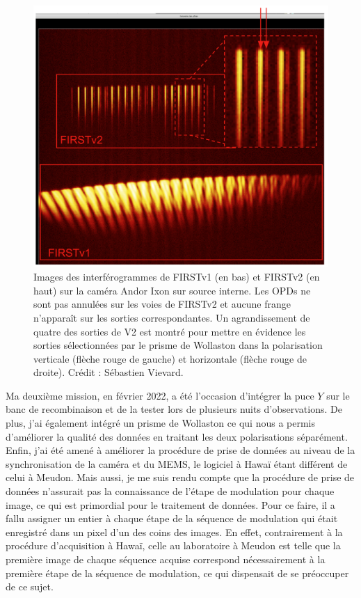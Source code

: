 \begin{figure}[ht!]
    \centering
    \includegraphics[width=\figwidth]{Figure_Chap5/image_2023_02_21T23_27_17_685Z.png}
    \caption[Images des interférogrammes de FIRSTv1 et FIRSTv2 sur la caméra Andor Ixon sur source interne.]{Images des interférogrammes de FIRSTv1 (en bas) et FIRSTv2 (en haut) sur la caméra Andor Ixon sur source interne. Les OPDs ne sont pas annulées sur les voies de FIRSTv2 et aucune frange n'apparaît sur les sorties correspondantes. Un agrandissement de quatre des sorties de V2 est montré pour mettre en évidence les sorties sélectionnées par le prisme de Wollaston dans la polarisation verticale (flèche rouge de gauche) et horizontale (flèche rouge de droite). Crédit : Sébastien Vievard.}
    \label{fig:V1V2Image}
\end{figure}

Ma deuxième mission, en février 2022, a été l'occasion d'intégrer la puce $Y$ sur le banc de recombinaison et de la tester lors de plusieurs nuits d'observations. De plus, j'ai également intégré un prisme de Wollaston ce qui nous a permis d'améliorer la qualité des données en traitant les deux polarisations séparément. Enfin, j'ai été amené à améliorer la procédure de prise de données au niveau de la synchronisation de la caméra et du \ac{MEMS}, le logiciel à Hawaï étant différent de celui à Meudon. Mais aussi, je me suis rendu compte que la procédure de prise de données n'assurait pas la connaissance de l'étape de modulation pour chaque image, ce qui est primordial pour le traitement de données. Pour ce faire, il a fallu assigner un entier à chaque étape de la séquence de modulation qui était enregistré dans un pixel d'un des coins des images. En effet, contrairement à la procédure d'acquisition à Hawaï, celle au laboratoire à Meudon est telle que la première image de chaque séquence acquise correspond nécessairement à la première étape de la séquence de modulation, ce qui dispensait de se préoccuper de ce sujet.


